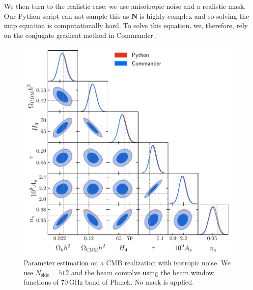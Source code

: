 \documentclass[twocolumn]{../common/aa}
\begin{document}
We then turn to the realistic case: we use anisotropic noise and a realistic mask. Our Python script can not sample this as $\textbf{N}$ is highly complex and so solving the map equation is computationally hard. To solve this equation, we, therefore, rely on the conjugate gradient method in Commander.

\begin{figure}
	\centering
	\includegraphics[width=\linewidth]{figures/dist_posterior_no_mask.pdf}
	\caption{\label{fig:nomask}Parameter estimation on a CMB realization with isotropic noise. We use $N_{\mathrm{side}}=512$ and the beam convolve using the beam window functions of 70\,GHz band of Planck. No mask is applied.}
\end{figure}
\end{document}
